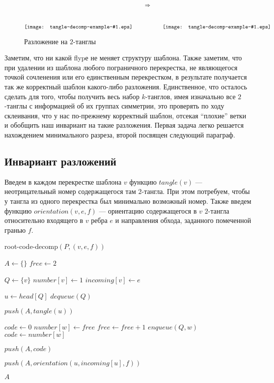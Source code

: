 		\begin{figure}[ht]
			\centering
			\def\pic#1{\raise-14mm\hbox{\texttt{[image: tangle-decomp-example-\#1.eps]}}}
			$$\pic{1} \qquad \Rightarrow \qquad \pic{2}$$
			\caption{Разложение на $2$-танглы}
		\end{figure}

		Заметим, что ни какой flypе не меняет структуру шаблона. Также заметим, что при удалении из шаблона любого пограничного
		перекрестка, не являющегося точкой сочленения или его единственным перекрестком, в результате получается так же корректный
		шаблон какого-либо разложения. Единственное, что осталось сделать для того, чтобы получить весь набор $k$-танглов, имея
		изначально все $2$-танглы с информацией об их группах симметрии, это проверять по ходу склеивания, что у нас по-прежнему
		корректный шаблон, отсекая ``плохие'' ветки и обобщить наш инвариант на такие разложения. Первая задача легко решается
		нахождением минимального разреза, второй посвящен следующий параграф.

	\subsection{Инвариант разложений}

		Введем в каждом перекрестке шаблона $v$ функцию $tangle(v)$ --- неотрицательный номер содержащегося там $2$-тангла. При этом
		потребуем, чтобы у тангла из одного перекрестка был минимально возможный номер. Также введем функцию $orientation(v, e, f)$
		--- ориентацию содержащегося в $v$ $2$-тангла относительно входящего в $v$ ребра $e$ и направления обхода, заданного помеченной
		гранью $f$.

		\begin{algorithm}[ht]
			\caption{root-code-decomp$(P, (v, e, f))$\label{algorithm:root-code-decomp}}
			\begin{algorithmic}[1]
				\STATE $A \leftarrow \{\}$
				\STATE $free \leftarrow 2$

				\STATE $Q \leftarrow \{v\}$
				\STATE $number[v] \leftarrow 1$
				\STATE $incoming[v] \leftarrow e$

					\STATE $u \leftarrow head[Q]$
					\STATE $dequeue(Q)$

					\STATE $push(A, tangle(u))$

							\STATE $code \leftarrow 0$
						\ELSE
								\STATE $number[w] \leftarrow free$
								\STATE $free \leftarrow free + 1$
								\STATE $enqueue(Q, w)$
							\ENDIF
							\STATE $code \leftarrow number[w]$
						\ENDIF

						\STATE $push(A, code)$
					\ENDFOR

					\STATE $push(A, orientation(u, incoming[u], f))$
				\ENDWHILE

				\RETURN $A$
			\end{algorithmic}
		\end{algorithm}

